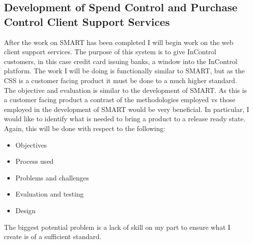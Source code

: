 \documentclass[a4paper,12pt, titlepage]{article}
\begin{document}
\subsection{Development of Spend Control and Purchase Control Client Support Services}
After the work on SMART has been completed I will begin work on the web client support services. The purpose of this system is to give InControl customers, in this case credit card issuing banks, a window into the InControl platform. The work I will be doing is functionally similar to SMART, but as the CSS is a customer facing product it must be done to a much higher standard.
\\The objective and evaluation is similar to the development of SMART. As this is a customer facing product a contrast of the methodologies employed vs those employed in the development of SMART would be very beneficial. In particular, I would like to identify what is needed to bring a product to a release ready state.
Again, this will be done with respect to the following:
\begin{itemize}
\item Objectives
\item Process used
\item Problems and challenges
\item Evaluation and testing
\item Design 
\end{itemize}
The biggest potential problem is a lack of skill on my part to ensure what I create is of a sufficient standard.
\end{document}
